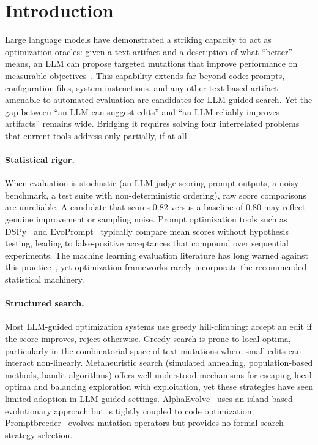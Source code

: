 \section{Introduction}
\label{sec:introduction}

Large language models have demonstrated a striking capacity to act as optimization oracles: given a text artifact and a description of what ``better'' means, an LLM can propose targeted mutations that improve performance on measurable objectives~\cite{novikov2025alphaevolve, romera2024funsearch}.
This capability extends far beyond code: prompts, configuration files, system instructions, and any other text-based artifact amenable to automated evaluation are candidates for LLM-guided search.
Yet the gap between ``an LLM can suggest edits'' and ``an LLM reliably improves artifacts'' remains wide.
Bridging it requires solving four interrelated problems that current tools address only partially, if at all.

\paragraph{Statistical rigor.}
When evaluation is stochastic (an LLM judge scoring prompt outputs, a noisy benchmark, a test suite with non-deterministic ordering), raw score comparisons are unreliable.
A candidate that scores 0.82 versus a baseline of 0.80 may reflect genuine improvement or sampling noise.
Prompt optimization tools such as DSPy~\cite{khattab2024dspy} and EvoPrompt~\cite{guo2023evoprompt} typically compare mean scores without hypothesis testing, leading to false-positive acceptances that compound over sequential experiments.
The machine learning evaluation literature has long warned against this practice~\cite{dror2018hitchhiker}, yet optimization frameworks rarely incorporate the recommended statistical machinery.

\paragraph{Structured search.}
Most LLM-guided optimization systems use greedy hill-climbing: accept an edit if the score improves, reject otherwise.
Greedy search is prone to local optima, particularly in the combinatorial space of text mutations where small edits can interact non-linearly.
Metaheuristic search (simulated annealing, population-based methods, bandit algorithms) offers well-understood mechanisms for escaping local optima and balancing exploration with exploitation, yet these strategies have seen limited adoption in LLM-guided settings.
AlphaEvolve~\cite{novikov2025alphaevolve} uses an island-based evolutionary approach but is tightly coupled to code optimization; Promptbreeder~\cite{fernando2024promptbreeder} evolves mutation operators but provides no formal search strategy selection.

